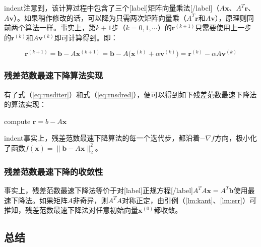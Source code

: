 \documentclass[UTF8,nofonts]{ctexart}
\begin{document}
indent注意到，该计算过程中包含了三个[label]矩阵向量乘法[/label]（$A\boldsymbol{x}$、$A^T\boldsymbol{r}$、$A\boldsymbol{v}$）。如果稍作修改的话，可以降为只需两次矩阵向量乘（$A^T\boldsymbol{r}$和$A\boldsymbol{v}$），原理则同前两个算法一样。事实上，第$k+1$步（$k=0,1,\cdots$）的$\boldsymbol{r}^{(k+1)}$只需要使用上一步的$\boldsymbol{r}^{(k)}$和$A\boldsymbol{v}^{(k)}$即可计算得到。即：

\begin{equation}
\label{eq:rnsdred}
\boldsymbol{r}^{(k+1)}=\boldsymbol{b}-A\boldsymbol{x}^{(k+1)}=\boldsymbol{b}-A\Big(\boldsymbol{x}^{(k)}+\alpha\boldsymbol{v}^{(k)}\Big)=\boldsymbol{r}^{(k)}-\alpha A\boldsymbol{v}^{(k)}
\end{equation}

\subsubsection*{残差范数最速下降算法实现}

有了式（\ref{eq:rnsditer}）和式（\ref{eq:rnsdred}），便可以得到如下残差范数最速下降法的算法实现：

\begin{algorithm}[H]
compute $\boldsymbol{r}=b-A\boldsymbol{x}$\;
\end{algorithm}

indent事实上，残差范数最速下降算法的每一个迭代步，都沿着$-\nabla f$方向，极小化了函数$f(\boldsymbol{x})=\|\boldsymbol{b}-A\boldsymbol{x}\|^2_2$。

\subsubsection*{残差范数最速下降的收敛性}


事实上，残差范数最速下降法等价于对[label]正规方程[/label]$A^TA\boldsymbol{x}=A^T\boldsymbol{b}$使用最速下降法。如果矩阵$A$非奇异，则$A^TA$对称正定，由引例（\ref{lm:kant}、\ref{lm:err}）可推知，残差范数最速下降法对任意初始向量$\boldsymbol{x}^{(0)}$都收敛。

\subsection*{总结}
\end{document}
